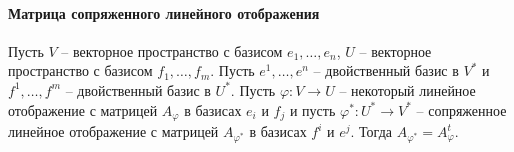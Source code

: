\paragraph{Матрица сопряженного линейного отображения}

\begin{claim}\label{claim::DualHomMatrix}
Пусть $V$ -- векторное пространство с базисом $e_1,\ldots,e_n$, $U$ -- векторное пространство с базисом $f_1,\ldots,f_m$. Пусть $e^1,\ldots,e^n$ -- двойственный базис в $V^*$ и $f^1,\ldots,f^m$ -- двойственный базис в $U^*$. Пусть $\varphi \colon V\to U$ -- некоторый линейное отображение с матрицей $A_\varphi$ в базисах $e_i$ и $f_j$ и пусть $\varphi^*\colon U^*\to V^*$ -- сопряженное линейное отображение с матрицей $A_{\varphi^*}$ в базисах $f^i$ и $e^j$. Тогда $A_{\varphi^*} = A_{\varphi}^t$.
\end{claim}
